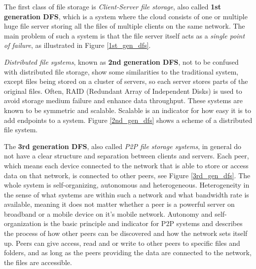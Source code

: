 The first class of file storage is \textit{Client-Server file storage}, also called \textbf{1st generation DFS}, which is a system where the cloud consists of one or multiple huge file server storing all the files of multiple clients on the same network. The main problem of such a system is that the file server itself acts as a \textit{single point of failure}, as illustrated in Figure \ref{1st_gen_dfs}.

\textit{Distributed file systems}, known as \textbf{2nd generation DFS}, not to be confused with distributed file storage, show some similarities to the traditional system, except files being stored on a cluster of servers, so each server stores parts of the original files. Often, RAID (Redundant Array of Independent Disks) is used to avoid storage medium failure and enhance data throughput. These systems are known to be symmetric and scalable. Scalable is an indicator for how easy it is to add endpoints to a system. Figure \ref{2nd_gen_dfs} shows a scheme of a distributed file system.

The \textbf{3rd generation DFS}, also called \textit{P2P file storage systems}, in general do not have a clear structure and separation between clients and servers. Each peer, which means each device connected to the network that is able to store or access data on that network, is connected to other peers, see Figure \ref{3rd_gen_dfs}. The whole system is self-organizing, autonomous and heterogeneous. Heterogeneity in the sense of what systems are within such a network and what bandwidth rate is available, meaning it does not matter whether a peer is a powerful server on broadband or a mobile device on it's mobile network. Autonomy and self-organization is the basic principle and indicator for P2P systems and describes the process of how other peers can be discovered and how the network sets itself up. Peers can give access, read and or write to other peers to specific files and folders, and as long as the peers providing the data are connected to the network, the files are accessible.
	
